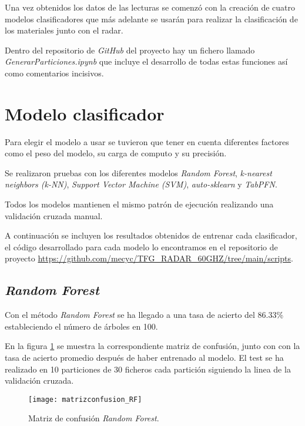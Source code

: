 Una vez obtenidos los datos de las lecturas se comenzó con la creación de cuatro modelos clasificadores que más adelante se usarán para realizar la clasificación de los materiales junto con el radar.

Dentro del repositorio de \textit{GitHub} del proyecto hay un fichero llamado \textit{GenerarParticiones.ipynb} que incluye el desarrollo de todas estas funciones así como comentarios incisivos.

\section{Modelo clasificador}
Para elegir el modelo a usar se tuvieron que tener en cuenta diferentes factores como el peso del modelo, su carga de computo y su precisión.

Se realizaron pruebas con los diferentes modelos \textit{Random Forest}, \textit{k-nearest neighbors (k-NN)}, \textit{Support Vector Machine (SVM)}, \textit{auto-sklearn} y \textit{TabPFN}. 

Todos los modelos mantienen el mismo patrón de ejecución realizando una validación cruzada manual.

A continuación se incluyen los resultados obtenidos de entrenar cada clasificador, el código desarrollado para cada modelo lo encontramos en el repositorio de proyecto \url{https://github.com/mecyc/TFG_RADAR_60GHZ/tree/main/scripts}.

\clearpage

\subsection{\textit{Random Forest}}

Con el método \textit{Random Forest} se ha llegado a una tasa de acierto del 86.33\% estableciendo el número de árboles en 100.

En la figura \ref{fig:matrizconfusion_RF} se muestra la correspondiente matriz de confusión, junto con con la tasa de acierto promedio después de haber entrenado al modelo. El test se ha realizado en 10 particiones de 30 ficheros cada partición siguiendo la linea de la validación cruzada.
\begin{figure}[h]
\begin{center}
	\texttt{[image: matrizconfusion\_RF]}
	\caption{Matriz de confusión \textit{Random Forest}.}
	\label{fig:matrizconfusion_RF}
\end{center}
\end{figure}

